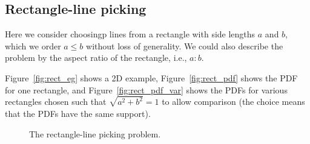 \subsection{Rectangle-line picking}
\label{sec:rectangle_line}


Here we consider choosingp lines from a rectangle with side lengths
$a$ and $b$, which we order $a \leq b$ without loss of generality. 
We could also describe the problem by the aspect ratio of the
rectangle, i.e., $a \!: \!b$.

Figure~\ref{fig:rect_eg} shows a 2D example, Figure~\ref{fig:rect_pdf}
shows the PDF for one rectangle, and Figure~\ref{fig:rect_pdf_var}
shows the PDFs for various rectangles chosen such that $\sqrt{a^2 +
  b^2} = 1$ to allow comparison (the choice means that the PDFs have
the same support).

\begin{figure}[tbp]
  \begin{center}
    \hspace{6mm}
    \caption{The rectangle-line picking problem.}
  \end{center} 
\vspace{-4mm}
\end{figure}

